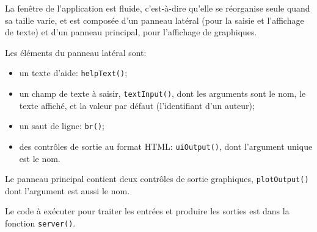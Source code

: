 \documentclass[
  12pt,
  french,
  a4paper,
  extrafontsizes,onecolumn,openright
  ]{memoir}
\providecommand{\tightlist}{%
  \setlength{\itemsep}{0pt}\setlength{\parskip}{0pt}}
\begin{document}
\normalsize

La fenêtre de l'application est fluide, c'est-à-dire qu'elle se réorganise seule quand sa taille varie, et est composée d'un panneau latéral (pour la saisie et l'affichage de texte) et d'un panneau principal, pour l'affichage de graphiques.

Les éléments du panneau latéral sont:

\begin{itemize}
\tightlist
\item
  un texte d'aide: \texttt{helpText()};
\item
  un champ de texte à saisir, \texttt{textInput()}, dont les arguments sont le nom, le texte affiché, et la valeur par défaut (l'identifiant d'un auteur);
\item
  un saut de ligne: \texttt{br()};
\item
  des contrôles de sortie au format HTML: \texttt{uiOutput()}, dont l'argument unique est le nom.
\end{itemize}

Le panneau principal contient deux contrôles de sortie graphiques, \texttt{plotOutput()} dont l'argument est aussi le nom.

Le code à exécuter pour traiter les entrées et produire les sorties est dans la fonction \texttt{server()}.

\scriptsize
\end{document}

